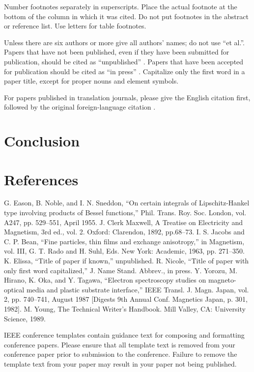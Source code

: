 \documentclass[conference]{IEEEtran}
\begin{document}
Number footnotes separately in superscripts. Place the actual footnote at 
the bottom of the column in which it was cited. Do not put footnotes in the 
abstract or reference list. Use letters for table footnotes.

Unless there are six authors or more give all authors' names; do not use 
``et al.''. Papers that have not been published, even if they have been 
submitted for publication, should be cited as ``unpublished'' \cite{b4}. Papers 
that have been accepted for publication should be cited as ``in press'' \cite{b5}. 
Capitalize only the first word in a paper title, except for proper nouns and 
element symbols.

For papers published in translation journals, please give the English 
citation first, followed by the original foreign-language citation \cite{b6}.

\section{Conclusion}


\section{References}



\begin{thebibliography}{00}
 G. Eason, B. Noble, and I. N. Sneddon, ``On certain integrals of Lipschitz-Hankel type involving products of Bessel functions,'' Phil. Trans. Roy. Soc. London, vol. A247, pp. 529--551, April 1955.
 J. Clerk Maxwell, A Treatise on Electricity and Magnetism, 3rd ed., vol. 2. Oxford: Clarendon, 1892, pp.68--73.
 I. S. Jacobs and C. P. Bean, ``Fine particles, thin films and exchange anisotropy,'' in Magnetism, vol. III, G. T. Rado and H. Suhl, Eds. New York: Academic, 1963, pp. 271--350.
 K. Elissa, ``Title of paper if known,'' unpublished.
 R. Nicole, ``Title of paper with only first word capitalized,'' J. Name Stand. Abbrev., in press.
 Y. Yorozu, M. Hirano, K. Oka, and Y. Tagawa, ``Electron spectroscopy studies on magneto-optical media and plastic substrate interface,'' IEEE Transl. J. Magn. Japan, vol. 2, pp. 740--741, August 1987 [Digests 9th Annual Conf. Magnetics Japan, p. 301, 1982].
 M. Young, The Technical Writer's Handbook. Mill Valley, CA: University Science, 1989.
\end{thebibliography}
\vspace{12pt}
\color{red}
IEEE conference templates contain guidance text for composing and formatting conference papers. Please ensure that all template text is removed from your conference paper prior to submission to the conference. Failure to remove the template text from your paper may result in your paper not being published.
\end{document}
